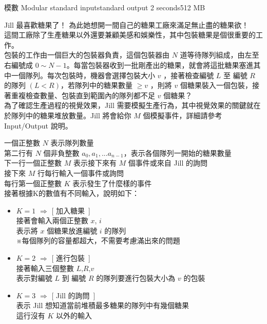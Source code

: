 \gdef\thisproblemauthor{}
\gdef\thisproblemdeveloper{}
\gdef\thisproblemorigin{}
\begin{problem}{模數 Modular}
{standard input}{standard output}
{2 seconds}{512 MB}{}

Jill 最喜歡糖果了！\newline
為此她想開一間自己的糖果工廠來滿足無止盡的糖果欲！\\
\newline
這間工廠除了生產糖果以外還要兼顧美感和娛樂性，其中包裝糖果是個很重要的工作。\\
包裝的工作由一個巨大的包裝器負責，這個包裝器由 $N$ 道等待隊列組成，由左至右編號成 $0 \sim N-1$。每當包裝器收到一批剛產出的糖果，就會將這批糖果塞進其中一個隊列。每次包裝時，機器會選擇包裝大小 $v$ ，接著檢查編號 $L$ 至 編號 $R$ 的隊列 $(L<R)$，若隊列中的糖果數量 $ \geq v $ ，則將 $v$ 個糖果裝入一個包裝，接著重複檢查數量、包裝直到範圍內的隊列都不足 $v$ 個糖果？\\
\newline
為了確認生產過程的視覺效果，Jill 需要模擬生產行為，其中視覺效果的關鍵就在於隊列中的糖果堆放數量。Jill 將會給你 $M$ 個模擬事件，詳細請參考 Input/Output 說明。\\
\newline
\InputFile

一個正整數 $N$ 表示隊列數量 \\
第二行有 $N$ 個非負整數 $a_0,a_1,...a_{n-1}$，表示各個隊列一開始的糖果數量\\
下一行一個正整數 $M$ 表示接下來有 $M$ 個事件或來自 Jill 的詢問 \\
接下來 $M$ 行每行輸入一個事件或詢問 \\
每行第一個正整數 $K$ 表示發生了什麼樣的事件 \\
接著根據K的數值有不同輸入，說明如下：
\begin{itemize}
\item $K=1$ $\Rightarrow$ [ 加入糖果\ ] \\
接著會輸入兩個正整數 $x$, $i$ \\
表示將 $x$ 個糖果放進編號 $i$ 的隊列\\
※每個隊列的容量都超大，不需要考慮滿出來的問題
\item $K=2$ $\Rightarrow$ [ 進行包裝\ ] \\
接著輸入三個整數 $L$,$R$,$v$ \\
 表示對編號 $L$ 到 編號 $R$ 的隊列要進行包裝大小為 $v$ 的包裝
\item $K=3$ $\Rightarrow$ [ Jill 的詢問\ ] \\
表示 Jill 想知道當前堆積最多糖果的隊列中有幾個糖果\\
這行沒有 $K$ 以外的輸入
\end{itemize}


\end{problem}
